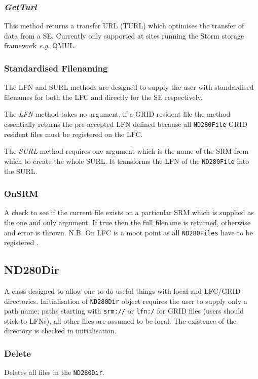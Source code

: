 \documentclass[11pt]{article}
\begin{document}
\subsubsection*{\textit{GetTurl}}
This method returns a transfer URL (TURL) which optimises the transfer
of data from a SE. Currently only supported at sites running the Storm
storage framework \textit{e.g.} QMUL.

\subsubsection*{Standardised Filenaming}
The LFN and SURL methods are designed to supply the
user with standardised filenames for both the LFC
and directly for the SE respectively. 

The \textit{LFN} method takes no
argument, if a GRID resident file the method essentially returns the
pre-accepted LFN defined because all \verb+ND280File+ GRID resident files
must be registered on the LFC.

The \textit{SURL} method requires one argument which is the name of
the SRM from which to create the whole SURL. It transforms the LFN of
the \verb+ND280File+ into the SURL.

\subsubsection*{OnSRM}
A check to see if the current file exists on a particular SRM which is
supplied as the one and only argument. If true then the full filename
is returned, otherwise and error is thrown. N.B. On LFC is a moot
point as all \verb+ND280Files+ have to be registered .

\subsection{ND280Dir}
A class designed to allow one to do useful things with local and
LFC/GRID directories. Initialisation of \verb+ND280Dir+ object requires the
user to supply only a path name; paths starting with \verb+srm://+
or \verb+lfn:/+ for GRID files (users should stick to LFNs), all
other files are assumed to be local. The existence of the directory is
checked in initialisation. 

\subsubsection*{Delete}
Deletes all files in the \verb+ND280Dir+.
\end{document}
